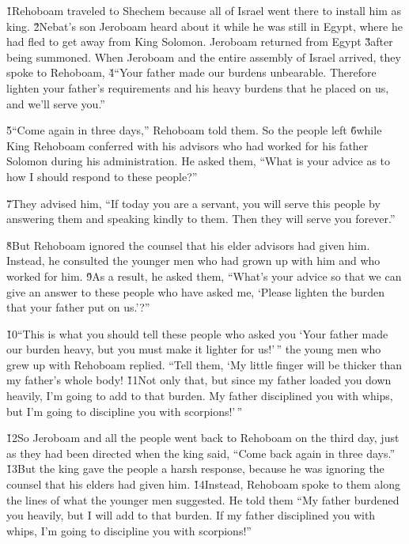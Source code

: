 \v{1}Rehoboam traveled to Shechem because all of Israel went there to install him as king. \v{2}Nebat's son Jeroboam heard about it while he was still in Egypt, where he had fled to get away from King Solomon. Jeroboam returned from Egypt \v{3}after being summoned. When Jeroboam and the entire assembly of Israel arrived, they spoke to Rehoboam, \v{4}``Your father made our burdens unbearable. Therefore lighten your father's requirements and his heavy burdens that he placed on us, and we'll serve you.''

\v{5}``Come again in three days,'' Rehoboam told them. So the people left \v{6}while King Rehoboam conferred with his advisors who had worked for his father Solomon during his administration. He asked them, ``What is your advice as to how I should respond to these people?''

\v{7}They advised him, ``If today you are a servant, you will serve this people by answering them and speaking kindly to them. Then they will serve you forever.''

\v{8}But Rehoboam ignored the counsel that his elder advisors had given him. Instead, he consulted the younger men who had grown up with him and who worked for him. \v{9}As a result, he asked them, ``What's your advice so that we can give an answer to these people who have asked me, `Please lighten the burden that your father put on us.'?''

\v{10}``This is what you should tell these people who asked you `Your father made our burden heavy, but you must make it lighter for us!'\,'' the young men who grew up with Rehoboam replied. ``Tell them, `My little finger will be thicker than my father's whole body! \v{11}Not only that, but since my father loaded you down heavily, I'm going to add to that burden. My father disciplined you with whips, but I'm going to discipline you with scorpions!'\,''

\v{12}So Jeroboam and all the people went back to Rehoboam on the third day, just as they had been directed when the king said, ``Come back again in three days.'' \v{13}But the king gave the people a harsh response, because he was ignoring the counsel that his elders had given him. \v{14}Instead, Rehoboam spoke to them along the lines of what the younger men suggested. He told them ``My father burdened you heavily, but I will add to that burden. If my father disciplined you with whips, I'm going to discipline you with scorpions!''

